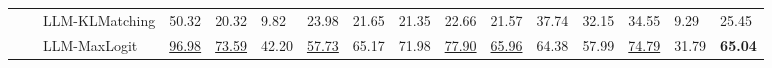 \begin{table}[ht!]
\begin{tabularx}{\textwidth}{@{}l l l |l *{11}{Y}|Y@{}}
 &  & LLM-KLMatching & 50.32 & 20.32 & 9.82 & 23.98 & 21.65 & 21.35 & 22.66 & 21.57 & 37.74 & 32.15 & 34.55 & 9.29 & 25.45 \\
 &  & LLM-MaxLogit & \underline{96.98} & \underline{73.59} & 42.20 & \underline{57.73} & 65.17 & 71.98 & \underline{77.90} & \underline{65.96} & 64.38 & 57.99 & \underline{74.79} & 31.79 & \textbf{65.04} \\
\bottomrule
\end{tabularx}
\label{table::openset_LCR1}
\end{table}